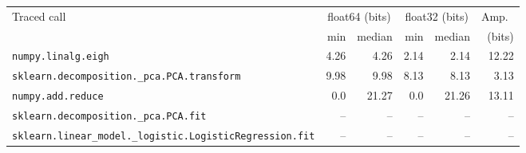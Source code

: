 \begin{tabular}{lrrrrr}
\toprule
Traced call & \multicolumn{2}{c}{float64 (bits)} & \multicolumn{2}{c}{float32 (bits)} & Amp.\ \\
\cmidrule(lr){2-3}\cmidrule(lr){4-5}
 & min & median & min & median & (bits) \\
\midrule
\texttt{numpy.linalg.eigh} & 4.26 & 4.26 & 2.14 & 2.14 & 12.22 \\
\texttt{sklearn.decomposition.\_pca.PCA.transform} & 9.98 & 9.98 & 8.13 & 8.13 & 3.13 \\
\texttt{numpy.add.reduce} & 0.0 & 21.27 & 0.0 & 21.26 & 13.11 \\
\texttt{sklearn.decomposition.\_pca.PCA.fit} & -- & -- & -- & -- & -- \\
\texttt{sklearn.linear\_model.\_logistic.LogisticRegression.fit} & -- & -- & -- & -- & -- \\
\bottomrule
\end{tabular}
